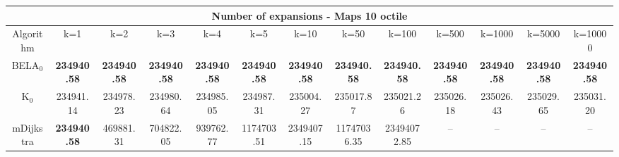 \begin{tabular}{c|cccccccccccc}\toprule
\multicolumn{13}{c}{Number of expansions - Maps 10 octile}\\ \midrule
Algorithm & k=1 & k=2 & k=3 & k=4 & k=5 & k=10 & k=50 & k=100 & k=500 & k=1000 & k=5000 & k=10000 \\ \midrule
BELA$_0$ & \textbf{234940.58} & \textbf{234940.58} & \textbf{234940.58} & \textbf{234940.58} & \textbf{234940.58} & \textbf{234940.58} & \textbf{234940.58} & \textbf{234940.58} & \textbf{234940.58} & \textbf{234940.58} & \textbf{234940.58} & \textbf{234940.58} \\
K$_0$ & 234941.14 & 234978.23 & 234980.64 & 234985.05 & 234987.31 & 235004.27 & 235017.87 & 235021.26 & 235026.18 & 235026.43 & 235029.65 & 235031.20 \\
mDijkstra & \textbf{234940.58} & 469881.31 & 704822.05 & 939762.77 & 1174703.51 & 2349407.15 & 11747036.35 & 23494072.85 & -- & -- & -- & -- \\ \bottomrule 
\end{tabular}
